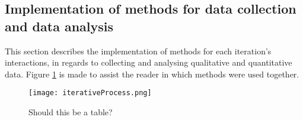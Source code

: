 \subsection{Implementation of methods for data collection and data analysis}

This section describes the implementation of methods for each iteration's interactions, in regards to collecting and analysing qualitative and quantitative data. Figure \ref{fig:methods} is made to assist the reader in which methods were used together.


\begin{figure}[h]
    \centering
    \texttt{[image: iterativeProcess.png]}
    \caption{Should this be a table?}
    \label{fig:methods}
\end{figure}


%
%
%
%
%
%
%
%
%
%
%
%
%
%
%

%

%

%

%
